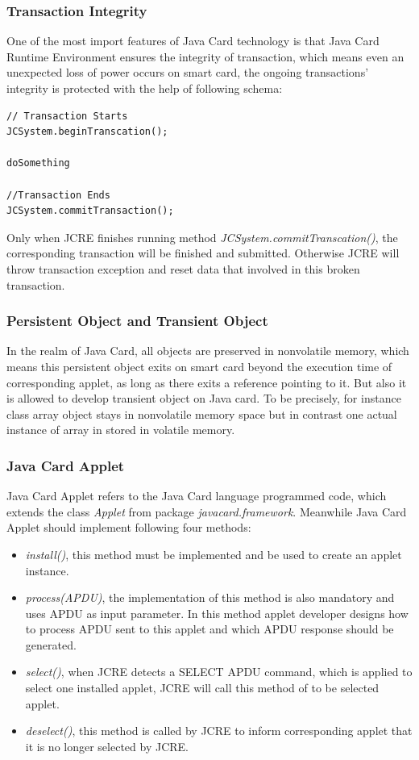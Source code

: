 \documentclass[]{llncs}
\begin{document}
\subsubsection{Transaction Integrity}
One of the most import features of Java Card technology is that Java Card Runtime Environment ensures the integrity of transaction, which means even an unexpected loss of power occurs on smart card, the ongoing transactions' integrity is protected with the help of following schema\cite{handbuch}:
\begin{verbatim}
// Transaction Starts
JCSystem.beginTranscation();

doSomething

//Transaction Ends
JCSystem.commitTransaction();
\end{verbatim}
Only when JCRE finishes running method \emph{JCSystem.commitTranscation()}, the corresponding transaction will be finished and submitted. Otherwise JCRE will throw transaction exception and reset data that involved in this broken transaction.

\subsubsection{Persistent Object and Transient Object}
In  the realm of Java Card, all objects are preserved in nonvolatile memory, which means this persistent object exits on smart card beyond the execution time of corresponding applet, as long as there exits a reference pointing to it. But also it is allowed to develop transient object on Java card. To be precisely, for instance class array object stays in nonvolatile memory space but in contrast one actual instance of array in stored in volatile memory\cite{handbuch}.
\subsubsection{Java Card Applet}
Java Card Applet refers to the Java Card language programmed code, which extends the class \emph{Applet} from package \emph{javacard.framework}. Meanwhile Java Card Applet should implement following four methods:
\begin{itemize}
\item\emph{install()}, this method must be implemented and be used to create an applet instance.
\item\emph{process(APDU)}, the implementation of this method is also mandatory and uses APDU as input parameter. In this method applet developer designs how to process APDU sent to this applet and which APDU response should be generated.
\item \emph{select()}, when JCRE detects a SELECT APDU command, which is applied to select one installed applet, JCRE will call this method of to be selected applet.
\item  \emph{deselect()}, this method is called by JCRE to inform corresponding applet that it is no longer selected by JCRE.
\end{itemize}
\end{document}
